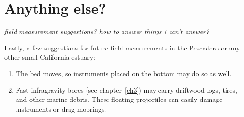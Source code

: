 \section{Anything else?} \label{backofch2}

\emph{field measurement suggestions? how to answer things i can't
answer?}

Lastly, a few suggestions for future field measurements in the Pescadero or any other small California estuary: 
\begin{enumerate}
	\item The bed moves, so instruments placed on the bottom may do so as well.
	\item Fast infragravity bores (see chapter~\ref{ch3}) may carry driftwood logs, tires, and other marine debris. These floating projectiles can easily damage instruments or drag moorings.
\end{enumerate}


